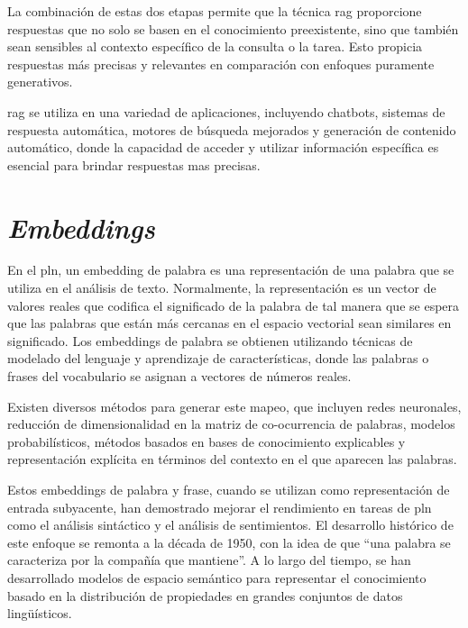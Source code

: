 
La combinación de estas dos etapas permite que la técnica \acrshort{rag} proporcione respuestas que no solo se basen en el conocimiento preexistente\cite{chen-etal-2017-reading}, sino que también sean sensibles al contexto específico de la consulta o la tarea. Esto propicia respuestas más precisas y relevantes en comparación con enfoques puramente generativos\cite{fan-etal-2019-eli5,hossain-etal-2020-simple}.


\acrshort{rag} se utiliza en una variedad de aplicaciones, incluyendo chatbots, sistemas de respuesta automática, motores de búsqueda mejorados y generación de contenido automático, donde la capacidad de acceder y utilizar información específica es esencial para brindar respuestas mas precisas.

\section{\textit{Embeddings}}

En el \acrfull{pln}, un embedding de palabra es una representación de una palabra que se utiliza en el análisis de texto. Normalmente, la representación es un vector de valores reales que codifica el significado de la palabra de tal manera que se espera que las palabras que están más cercanas en el espacio vectorial sean similares en significado. Los embeddings de palabra se obtienen utilizando técnicas de modelado del lenguaje y aprendizaje de características, donde las palabras o frases del vocabulario se asignan a vectores de números reales.

Existen diversos métodos para generar este mapeo, que incluyen redes neuronales, reducción de dimensionalidad en la matriz de co-ocurrencia de palabras, modelos probabilísticos, métodos basados en bases de conocimiento explicables y representación explícita en términos del contexto en el que aparecen las palabras\cite{mikolov2013distributed}.

Estos embeddings de palabra y frase, cuando se utilizan como representación de entrada subyacente, han demostrado mejorar el rendimiento en tareas de \acrshort{pln} como el análisis sintáctico y el análisis de sentimientos. El desarrollo histórico de este enfoque se remonta a la década de 1950, con la idea de que ``una palabra se caracteriza por la compañía que mantiene''. A lo largo del tiempo, se han desarrollado modelos de espacio semántico para representar el conocimiento basado en la distribución de propiedades en grandes conjuntos de datos lingüísticos.

